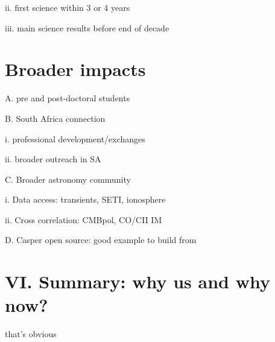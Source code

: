 \documentclass[preprint]{aastex}
\begin{document}
ii. first science within 3 or 4 years

iii. main science results before end of decade


\section{Broader impacts} %

A. pre and post-doctoral students

B. South Africa connection

i. professional development/exchanges

ii. broader outreach in SA

C. Broader astronomy community

i. Data access: transients, SETI, ionosphere

ii. Cross correlation: CMBpol, CO/CII IM

D. Casper open source: good example to build from


\section{VI. Summary: why us and why now?} %

that's obvious


\clearpage
\setcounter{page}{1}
\thispagestyle{empty}
%
%


\end{document}
